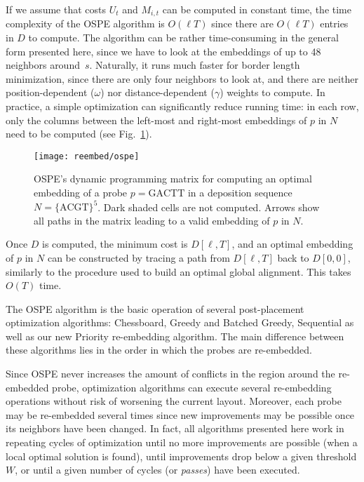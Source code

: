If we assume that costs $U_t$ and $M_{i,t}$ can be computed in constant time,
the time complexity of the OSPE algorithm is $O(\ell T)$ since there are
$O(\ell T)$ entries in $D$ to compute. The algorithm can be rather
time-consuming in the general form presented here, since we have to look at the
embeddings of up to 48 neighbors around~$s$. Naturally, it runs much faster for
border length minimization, since there are only four neighbors to look at, and
there are neither position-dependent ($\omega$) nor distance-dependent
($\gamma$) weights to compute. In practice, a simple optimization can
significantly reduce running time: in each row, only the columns between the
left-most and right-most embeddings of $p$ in $N$ need to be computed (see
Fig.~\ref{fig:ospe}).

\begin{figure}[t]\centering
\texttt{[image: reembed/ospe]}
\caption{\label{fig:ospe}%
  OSPE's dynamic programming matrix for computing an optimal embedding of a
  probe $p=\text{GACTT}$ in a deposition sequence $N=\text{\{ACGT\}}^5$. Dark
  shaded cells are not computed. Arrows show all paths in the matrix leading to
  a valid embedding of $p$ in $N$.}
\end{figure}

Once $D$ is computed, the minimum cost is $D[\ell,T]$, and an optimal embedding
of $p$ in $N$ can be constructed by tracing a path from $D[\ell,T]$ back to
$D[0,0]$, similarly to the procedure used to build an optimal global alignment.
This takes $O(T)$ time.

The OSPE algorithm is the basic operation of several post-placement optimization
algorithms: Chessboard, Greedy and Batched Greedy, Sequential as well as our new
Priority re-embedding algorithm. The main difference between these algorithms
lies in the order in which the probes are re-embedded.

Since OSPE never increases the amount of conflicts in the region around the
re-embedded probe, optimization algorithms can execute several re-embedding
operations without risk of worsening the current layout. Moreover, each probe
may be re-embedded several times since new improvements may be possible once its
neighbors have been changed. In fact, all algorithms presented here work in
repeating cycles of optimization until no more improvements are possible (when a
local optimal solution is found), until improvements drop below a given
threshold $W$, or until a given number of cycles (or \emph{passes}) have been
executed.

